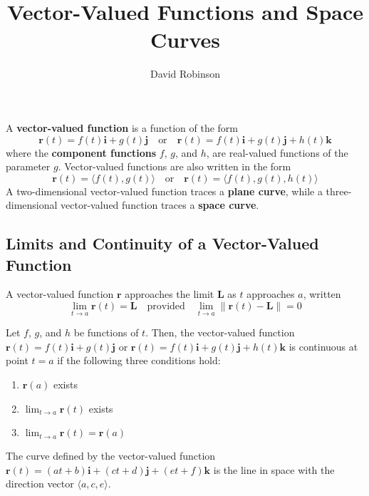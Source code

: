 \documentclass{article}
\title{Vector-Valued Functions and Space Curves}
\author{David Robinson}
\date{}
\begin{document}
\maketitle

A \textbf{vector-valued function} is a function of the form
\[\mathbf{r}(t)=f(t)\mathbf{i}+g(t)\mathbf{j}\quad\text{or}\quad\mathbf{r}(t)=f(t)\mathbf{i}+g(t)\mathbf{j}+h(t)\mathbf{k}\]
where the \textbf{component functions} $f$, $g$, and $h$, are real-valued functions of the parameter $g$. Vector-valued functions are also written in the form
\[\mathbf{r}(t)=\langle f(t), g(t)\rangle\quad\text{or}\quad\mathbf{r}(t)=\langle f(t), g(t), h(t)\rangle\]
A two-dimensional vector-valued function traces a \textbf{plane curve}, while a three-dimensional vector-valued function traces a \textbf{space curve}.

\subsection*{Limits and Continuity of a Vector-Valued Function}
A vector-valued function $\mathbf{r}$ approaches the limit $\mathbf{L}$ as $t$ approaches $a$, written
\[\lim_{t\rightarrow a}\mathbf{r}(t)=\mathbf{L}\quad\text{provided}\quad\lim_{t\rightarrow a}\|\mathbf{r}(t)-\mathbf{L}\|=0\]

Let $f$, $g$, and $h$ be functions of $t$. Then, the vector-valued function $\mathbf{r}(t)=f(t)\mathbf{i}+g(t)\mathbf{j}$ or $\mathbf{r}(t)=f(t)\mathbf{i}+g(t)\mathbf{j}+h(t)\mathbf{k}$ is continuous at point $t=a$ if the following three conditions hold:
\begin{enumerate}
    \item $\mathbf{r}(a)$ exists
    \item $\lim_{t\rightarrow a}\mathbf{r}(t)$ exists
    \item $\lim_{t\rightarrow a}\mathbf{r}(t)=\mathbf{r}(a)$
\end{enumerate}

The curve defined by the vector-valued function $\mathbf{r}(t)=(at+b)\mathbf{i}+(ct+d)\mathbf{j}+(et+f)\mathbf{k}$ is the line in space with the direction vector $\langle a, c, e\rangle$.
\end{document}

